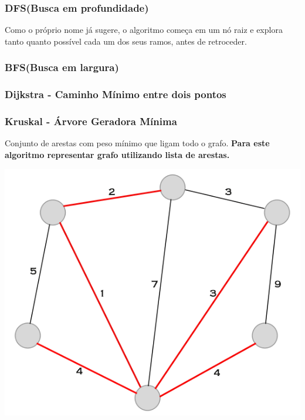 \documentclass[a4paper,12pt]{article}
\begin{document}
\subsubsection{DFS(Busca em profundidade)}

Como o próprio nome já sugere, o algoritmo começa em um nó raiz e explora tanto quanto possível cada um dos seus ramos, antes de retroceder.


\subsubsection{BFS(Busca em largura)}


\subsubsection{Dijkstra - Caminho Mínimo entre dois pontos}


\subsubsection{Kruskal - Árvore Geradora Mínima}

Conjunto de arestas com peso mínimo que ligam todo o grafo. \textbf{Para este algoritmo representar grafo utilizando lista de arestas.}


\begin{center}
  \includegraphics[width=\linewidth/2]{figures/grafos/agm.png}
\end{center}
\end{document}

